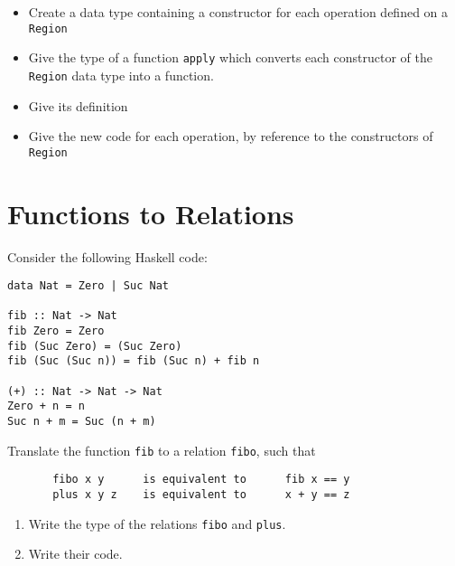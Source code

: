 \documentclass{article}
\newcommand{\answer}[1]{}
\begin{document}
\begin{itemize}
\item Create a data type containing a constructor for each operation defined on a \texttt{Region} 
\item Give the type of a function \texttt{apply} which converts each constructor of the \texttt{Region} data type into a function. 
\item Give its definition 
\item Give the new code for each operation, by reference to the constructors of \texttt{Region} 
\end{itemize}

\answer{
  \begin{verbatim}
data Region = Outside Region
            | Intersect Region Region
            | Within Float Point

apply :: Region -> Point -> Bool
apply (Outside r) p       = not (apply r p)
apply (Intersect r1 r2) p = r1 p && r2 p
apply (Within range p1) p2 = norm2 (p1 .-. p2) <= range * range

outside :: Region -> Region
outside r = Outside r

intersect :: Region -> Region -> Region
intersect r1 r2 = Intersect r1 r2

withinRange :: Float -> Point -> Region
withinRange range p1 p2 = Within range p1 p2
  \end{verbatim}
}

\newpage
\section{Functions to Relations}

Consider the following Haskell code:
\begin{verbatim}
data Nat = Zero | Suc Nat

fib :: Nat -> Nat
fib Zero = Zero
fib (Suc Zero) = (Suc Zero)
fib (Suc (Suc n)) = fib (Suc n) + fib n

(+) :: Nat -> Nat -> Nat
Zero + n = n
Suc n + m = Suc (n + m)
\end{verbatim}

Translate the function \texttt{fib} to a relation \texttt{fibo}, such that
\begin{verbatim}
       fibo x y      is equivalent to      fib x == y
       plus x y z    is equivalent to      x + y == z
\end{verbatim}

\begin{enumerate}
\item Write the type of the relations \texttt{fibo} and
  \texttt{plus}. 
\item Write their code. 
\end{enumerate}
\end{document}
